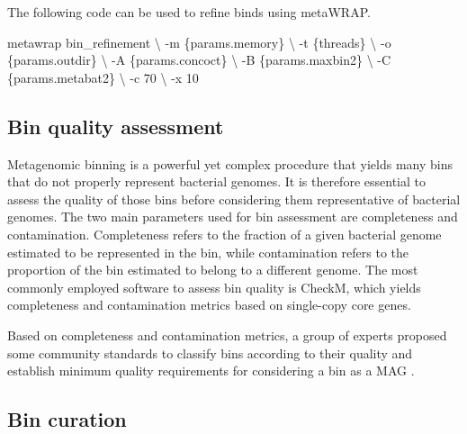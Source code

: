 \documentclass[
]{book}
\newenvironment{Shaded}{\begin{snugshade}}{\end{snugshade}}
\newcommand{\AttributeTok}[1]{\textcolor[rgb]{0.13,0.29,0.53}{#1}}
\newcommand{\DataTypeTok}[1]{\textcolor[rgb]{0.13,0.29,0.53}{#1}}
\newcommand{\ExtensionTok}[1]{#1}
\newcommand{\NormalTok}[1]{#1}
\begin{document}
\normalsize

The following code can be used to refine binds using metaWRAP.
\small

\begin{Shaded}
\begin{Highlighting}[]
\ExtensionTok{metawrap}\NormalTok{ bin\_refinement }\DataTypeTok{\textbackslash{}}
    \AttributeTok{{-}m}\NormalTok{ \{params.memory\} }\DataTypeTok{\textbackslash{}}
    \AttributeTok{{-}t}\NormalTok{ \{threads\} }\DataTypeTok{\textbackslash{}}
    \AttributeTok{{-}o}\NormalTok{ \{params.outdir\} }\DataTypeTok{\textbackslash{}}
    \AttributeTok{{-}A}\NormalTok{ \{params.concoct\} }\DataTypeTok{\textbackslash{}}
    \AttributeTok{{-}B}\NormalTok{ \{params.maxbin2\} }\DataTypeTok{\textbackslash{}}
    \AttributeTok{{-}C}\NormalTok{ \{params.metabat2\} }\DataTypeTok{\textbackslash{}}
    \AttributeTok{{-}c}\NormalTok{ 70 }\DataTypeTok{\textbackslash{}}
    \AttributeTok{{-}x}\NormalTok{ 10}
\end{Highlighting}
\end{Shaded}

\normalsize

\hypertarget{genome-resolved-qc}{%
\subsection*{Bin quality assessment}\label{genome-resolved-qc}}

Metagenomic binning is a powerful yet complex procedure that yields many bins that do not properly represent bacterial genomes. It is therefore essential to assess the quality of those bins before considering them representative of bacterial genomes. The two main parameters used for bin assessment are completeness and contamination. Completeness refers to the fraction of a given bacterial genome estimated to be represented in the bin, while contamination refers to the proportion of the bin estimated to belong to a different genome. The most commonly employed software to assess bin quality is CheckM, which yields completeness and contamination metrics based on single-copy core genes.

Based on completeness and contamination metrics, a group of experts proposed some community standards to classify bins according to their quality and establish minimum quality requirements for considering a bin as a MAG \citep{Bowers2017-kj}.

\hypertarget{genome-resolved-curation}{%
\subsection*{Bin curation}\label{genome-resolved-curation}}
\end{document}
